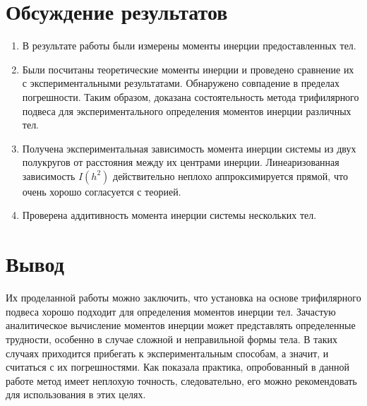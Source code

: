 \documentclass[a4, 12pt]{article}
\begin{document}
	\section{Обсуждение результатов}
	\begin{enumerate}
		\item В результате работы были измерены моменты инерции предоставленных тел.
		\item Были посчитаны теоретические моменты инерции и проведено сравнение их
		с экспериментальными результатами. Обнаружено совпадение в пределах погрешности.
		Таким образом, доказана состоятельность метода трифилярного подвеса для
		экспериментального определения моментов инерции различных тел.
		\item Получена экспериментальная зависимость момента инерции системы из двух полукругов
		от расстояния между их центрами инерции. Линеаризованная зависимость $I(h^2)$ действительно
		неплохо аппроксимируется прямой, что очень хорошо согласуется с теорией.
		\item Проверена аддитивность момента инерции системы нескольких тел.
	\end{enumerate}
	\section{Вывод}
	Их проделанной работы можно заключить, что установка на основе трифилярного подвеса хорошо
	подходит для определения моментов инерции тел. Зачастую аналитическое вычисление моментов
	инерции может представлять определенные трудности, особенно в случае сложной и неправильной
	формы тела. В таких случаях приходится прибегать к экспериментальным способам, а значит,
	и считаться с их погрешностями. Как показала практика, опробованный в данной работе метод
	имеет неплохую точность, следовательно, его можно рекомендовать для использования в этих целях.
\end{document}
